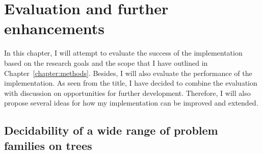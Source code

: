 \chapter{Evaluation and further enhancements}
\label{chapter:evaluation}

In this chapter, I will attempt to evaluate the success of the implementation
based on the research goals and the scope that I have outlined in Chapter~\ref{chapter:methods}.
Besides, I will also evaluate the performance of the implementation.
As seen from the title,
I have decided to combine the evaluation with discussion on opportunities for further
development. Therefore, I will also propose several ideas for how my implementation
can be improved and extended.

\section{Decidability of a wide range of problem families on trees}


